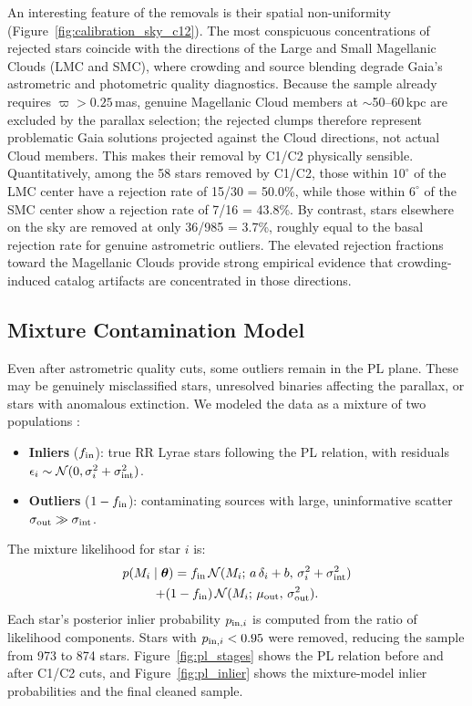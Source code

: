 \documentclass[10pt,preprint2]{aastex}
\begin{document}
An interesting feature of the removals is their spatial non-uniformity (Figure~\ref{fig:calibration_sky_c12}). The most conspicuous concentrations of rejected stars coincide with the directions of the Large and Small Magellanic Clouds (LMC and SMC), where crowding and source blending degrade Gaia's astrometric and photometric quality diagnostics. Because the sample already requires $\varpi > 0.25$\,mas, genuine Magellanic Cloud members at $\sim$50--60\,kpc are excluded by the parallax selection; the rejected clumps therefore represent problematic Gaia solutions projected against the Cloud directions, not actual Cloud members. This makes their removal by C1/C2 physically sensible. Quantitatively, among the 58 stars removed by C1/C2, those within $10^\circ$ of the LMC center have a rejection rate of 15/30 = 50.0\%, while those within $6^\circ$ of the SMC center show a rejection rate of 7/16 = 43.8\%. By contrast, stars elsewhere on the sky are removed at only 36/985 = 3.7\%, roughly equal to the basal rejection rate for genuine astrometric outliers. The elevated rejection fractions toward the Magellanic Clouds provide strong empirical evidence that crowding-induced catalog artifacts are concentrated in those directions.

\subsection{Mixture Contamination Model}

Even after astrometric quality cuts, some outliers remain in the PL plane. These may be genuinely misclassified stars, unresolved binaries affecting the parallax, or stars with anomalous extinction. We modeled the data as a mixture of two populations \citep{Hogg2010}:
\begin{itemize}
  \item \textbf{Inliers} ($f_{\rm in}$): true RR Lyrae stars following the PL relation, with residuals $\epsilon_i \sim \mathcal{N}(0, \sigma_i^2 + \sigma_{\rm int}^2)$.
  \item \textbf{Outliers} ($1-f_{\rm in}$): contaminating sources with large, uninformative scatter $\sigma_{\rm out} \gg \sigma_{\rm int}$.
\end{itemize}

The mixture likelihood for star $i$ is:
\begin{multline}
  p(M_i \mid \boldsymbol{\theta}) = f_{\rm in}\, \mathcal{N}(M_i;\, a\,\delta_i + b,\, \sigma_i^2 + \sigma_{\rm int}^2) \\
    + (1-f_{\rm in})\, \mathcal{N}(M_i;\, \mu_{\rm out},\, \sigma_{\rm out}^2).
\end{multline}
Each star's posterior inlier probability $p_{{\rm in},i}$ is computed from the ratio of likelihood components. Stars with $p_{{\rm in},i} < 0.95$ were removed, reducing the sample from 973 to 874 stars. Figure~\ref{fig:pl_stages} shows the PL relation before and after C1/C2 cuts, and Figure~\ref{fig:pl_inlier} shows the mixture-model inlier probabilities and the final cleaned sample.
\end{document}
